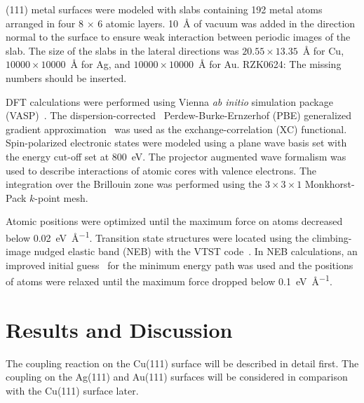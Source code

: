 \documentclass[%
 reprint,
 amsmath,amssymb,
 aps,
prb,
floatfix,
]{revtex4-2}
\newcommand{\lock}{\color{red}}
\newcommand{\zhzh}{\color{blue}}
\newcommand{\lock}{\color{black}}
\newcommand{\zhzh}{\color{blue}}
\newcommand{\comm}{\color{ForestGreen}} %
\begin{document}
{\lock

(111) metal surfaces were modeled with slabs containing 192 metal atoms arranged in four 8 $\times$ 6 atomic layers. \SI{10}{\angstrom} of vacuum was added in the direction normal to the surface to ensure weak interaction between periodic images of the slab. The size of the slabs in the lateral directions was $20.55 \times 13.35$~\si{\angstrom} for Cu, $10000 \times 10000$~\si{\angstrom} for Ag, and $10000 \times 10000$~\si{\angstrom} for Au. 
{\comm RZK0624: The missing numbers should be inserted.}

DFT calculations were performed using Vienna \emph{ab initio} simulation package (VASP)~\cite{ullmann_131, ullmann_132, ullmann_133, ullmann_134}. The dispersion-corrected~\cite{ullmann_136, ullmann_137} Perdew-Burke-Ernzerhof (PBE) generalized gradient approximation~\cite{ullmann_139} was used as the exchange-correlation (XC) functional. 
Spin-polarized electronic states were modeled using a plane wave basis set with the energy cut-off set at \SI{800}{\electronvolt}.
The projector augmented wave formalism was used to describe interactions of atomic cores with valence electrons. The integration over the Brillouin zone was performed using the $3\times 3 \times1$ Monkhorst-Pack $k$-point mesh. 

Atomic positions were optimized until the maximum force on atoms decreased below \SI{0.02}{\electronvolt\per\angstrom}. 
Transition state structures were located using the climbing-image nudged elastic band (NEB) with the VTST code~\cite{ullmann_59}. 
In NEB calculations, an improved initial guess~\cite{ullmann_60, ullmann_99} for the minimum energy path was used and the positions of atoms were relaxed until the maximum force dropped below \SI{0.1}{\electronvolt\per\angstrom}.

}

\section{Results and Discussion}

The coupling reaction on the Cu(111) surface will be described in detail first. The coupling on the Ag(111) and Au(111) surfaces will be considered in comparison with the Cu(111) surface later.
\end{document}
